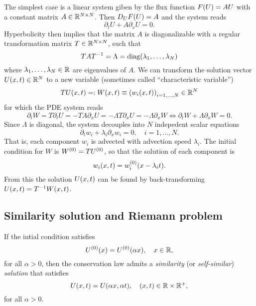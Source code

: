 \begin{example}
	The simplest case is a linear system giben by the flux function \(F\parentheses*{U} = AU\) with a constant matrix \(A \in \R^{N \times N}\).
	Then \(D_U F\parentheses*{U} = A\) and the system reads
	\[
		\partial_t U + A\partial_x U = 0.
	\]
	Hyperbolicity then implies that the matrix \(A\) is diagonalizable with a regular transformation matrix \(T \in \R^{N \times N}\), such that
	\[
		TAT^{-1} = \Lambda = \diag\parentheses*{\lambda_1, \ldots, \lambda_N}
	\]
	where \(\lambda_1, \ldots, \lambda_N \in \R\) are eigenvalues of \(A\).
	We can transform the solution vector \(U\parentheses*{x, t} \in \R^N\) to a new variable (sometimes called ``characteristic variable'')
	\[
		TU\parentheses*{x, t} =: W\parentheses*{x, t} \equiv \parentheses*{w_i\parentheses*{x, t}}_{i = 1, \ldots, N} \in \R^N
	\]
	for which the PDE system reads
	\[
		\partial_t W = T\partial_t U = -TA\partial_x U = -\Lambda T\partial_x U = -\Lambda\partial_x W \iff \partial_t W + \Lambda\partial_x W = 0.
	\]
	Since \(\Lambda\) is diagonal, the system decouples into \(N\) indepedent scalar equations
	\[
		\partial_t w_i + \lambda_i \partial_x w_i = 0, \quad i = 1, \ldots, N.
	\]
	That is, each component \(w_i\) is advected with advection speed \(\lambda_i\).
	The initial condition for \(W\) is \(W^{\parentheses*{0}} = TU^{\parentheses*{0}}\), so that the solution of each component is
	\[
		w_i\parentheses*{x, t} = w_i^{\parentheses*{0}}\parentheses*{x - \lambda_i t}.
	\]
	From this the solution \(U\parentheses*{x, t}\) can be found by back-transforming \(U\parentheses*{x, t} = T^{-1}W\parentheses*{x, t}\).
\end{example}


\subsection{Similarity solution and Riemann problem}

\begin{theorem}
	If the intial condition satisfies
	\[
		U^{\parentheses*{0}}\parentheses*{x} = U^{\parentheses*{0}}\parentheses*{\alpha x}, \quad x \in \R,
	\]
	for all \(\alpha > 0\), then the conservation law admits a \emph{similarity} (or \emph{self-similar}) \emph{solution} that satisfies
	\[
		U\parentheses*{x, t} = U\parentheses*{\alpha x, \alpha t}, \quad \parentheses*{x, t} \in \R \times \R^+,
	\]
	for all \(\alpha > 0\).
\end{theorem}

